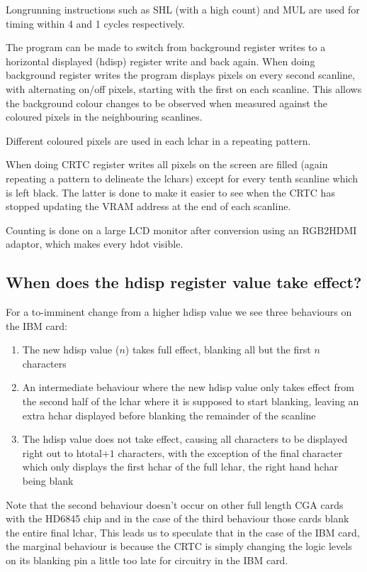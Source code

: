 \documentclass[a4paper,10pt]{amsart}
\begin{document}
Longrunning instructions such as SHL (with a high count) and MUL are used for
timing within 4 and 1 cycles respectively.

The program can be made to switch from background register writes to a
horizontal displayed (hdisp) register write and back again. When doing
background register writes the program displays pixels on every second
scanline, with alternating on/off pixels, starting with the first on each
scanline. This allows the background colour changes to be observed when
measured against the coloured pixels in the neighbouring scanlines.

Different coloured pixels are used in each lchar in a repeating pattern.

When doing CRTC register writes all pixels on the screen are filled (again
repeating a pattern to delineate the lchars) except for every tenth scanline
which is left black. The latter is done to make it easier to see when the
CRTC has stopped updating the VRAM address at the end of each scanline.

Counting is done on a large LCD monitor after conversion using an RGB2HDMI
adaptor, which makes every hdot visible.

\subsection{When does the hdisp register value take effect?}

For a to-imminent change from a higher hdisp value we see three behaviours on
the IBM card:

\begin{enumerate}
\item The new hdisp value ($n$) takes full effect, blanking all but the
first $n$ characters
\item An intermediate behaviour where the new hdisp value only takes effect
from the second half of the lchar where it is supposed to start blanking, leaving
an extra hchar displayed before blanking the remainder of the scanline
\item The hdisp value does not take effect, causing all characters to be
displayed right out to htotal$+1$ characters, with the exception
of the final character which only displays the first hchar of the full lchar,
the right hand hchar being blank
\end{enumerate}

Note that the second behaviour doesn't occur on other full length CGA cards
with the HD6845 chip and in the case of the third behaviour those cards blank
the entire final lchar, This leads us to speculate that in the case of the IBM
card, the marginal behaviour is because the CRTC is simply changing the logic
levels on its blanking pin a little too late for circuitry in the IBM card.
\end{document}
